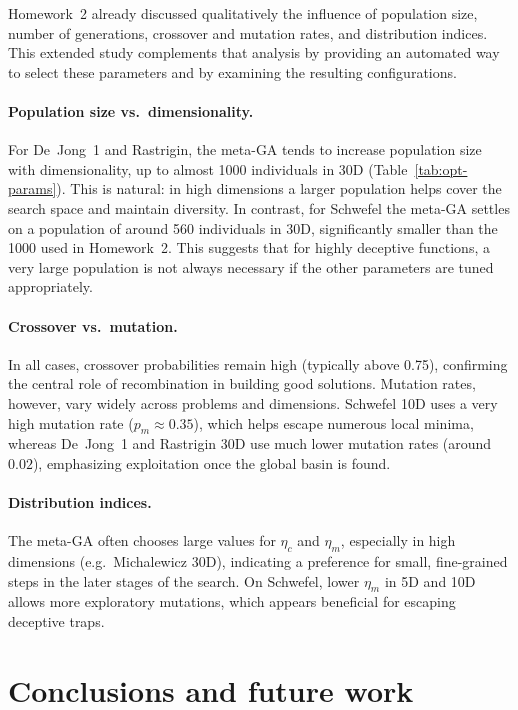 \documentclass[11pt]{article}
\begin{document}
Homework~2 already discussed qualitatively the influence of population size,
number of generations, crossover and mutation rates, and distribution
indices.
This extended study complements that analysis by providing an automated way to
select these parameters and by examining the resulting configurations.

\paragraph{Population size vs. dimensionality.}
For De~Jong~1 and Rastrigin, the meta-GA tends to increase population size
with dimensionality, up to almost 1000 individuals in 30D
(Table~\ref{tab:opt-params}).
This is natural: in high dimensions a larger population helps cover the
search space and maintain diversity.
In contrast, for Schwefel the meta-GA settles on a population of around 560
individuals in 30D, significantly smaller than the 1000 used in Homework~2.
This suggests that for highly deceptive functions, a very large population is
not always necessary if the other parameters are tuned appropriately.

\paragraph{Crossover vs. mutation.}
In all cases, crossover probabilities remain high (typically above 0.75),
confirming the central role of recombination in building good solutions.
Mutation rates, however, vary widely across problems and dimensions.
Schwefel 10D uses a very high mutation rate ($p_m \approx 0.35$), which
helps escape numerous local minima, whereas De~Jong~1 and Rastrigin 30D use
much lower mutation rates (around $0.02$), emphasizing exploitation once the
global basin is found.

\paragraph{Distribution indices.}
The meta-GA often chooses large values for $\eta_c$ and $\eta_m$,
especially in high dimensions (e.g.\ Michalewicz 30D),
indicating a preference for small, fine-grained steps in the later stages of
the search.
On Schwefel, lower $\eta_m$ in 5D and 10D allows more exploratory mutations,
which appears beneficial for escaping deceptive traps.

\section{Conclusions and future work}
\end{document}
